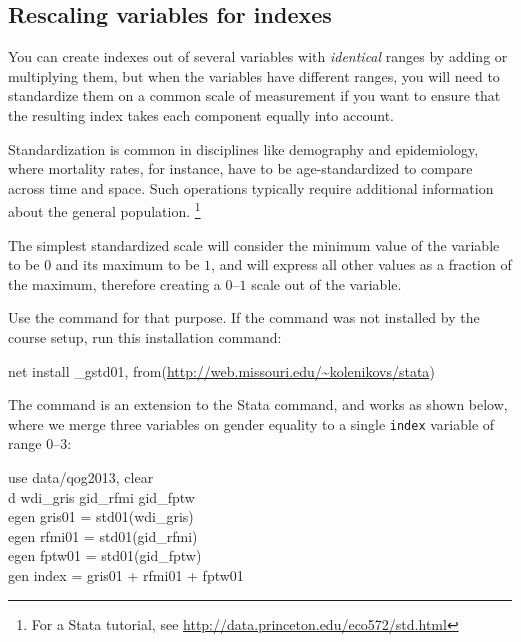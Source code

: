


%
\subsection{Rescaling variables for indexes}

You can create indexes out of several variables with \emph{identical} ranges by adding or multiplying them, but when the variables have different ranges, you will need to standardize them on a common scale of measurement if you want to ensure that the resulting index takes each component equally into account.

Standardization is common in disciplines like demography and epidemiology, where mortality rates, for instance, have to be age-standardized to compare across time and space. Such operations typically require additional information about the general population.%
  \footnote{For a Stata tutorial, see \url{http://data.princeton.edu/eco572/std.html}}

The simplest standardized scale will consider the minimum value of the variable to be $0$ and its maximum to be $1$, and will express all other values as a fraction of the maximum, therefore creating a $0$--$1$ scale out of the variable.

\label{sec:gtsd01}%
Use the  command for that purpose. If the command was not installed by the course setup, run this installation command:%
	
  \begin{fullwidth}
	  \begin{docspec}
		  net install \_gstd01,%
			  from(\url{http://web.missouri.edu/~kolenikovs/stata})
	  \end{docspec}  
  \end{fullwidth}
	
The command is an extension to the Stata  command, and works as shown below, where we merge three \QOG variables on gender equality to a single \texttt{index} variable of range $0$--$3$:%

\begin{docspec}
	use data/qog2013, clear\\
	d wdi\_gris gid\_rfmi gid\_fptw\\
	egen gris01 = std01(wdi\_gris)\\
	egen rfmi01 = std01(gid\_rfmi)\\
	egen fptw01 = std01(gid\_fptw)\\
	gen index = gris01 + rfmi01 + fptw01
\end{docspec}

